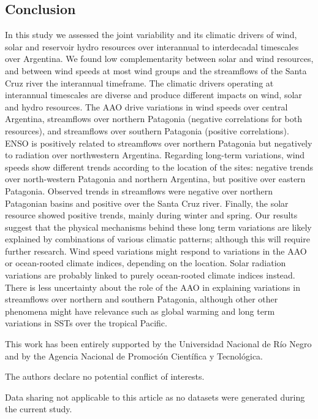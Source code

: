 \documentclass[AMA,Times1COL]{WileyNJDv5} %
\begin{document}
\begin{linenumbers}
\section{Conclusion}

In this study we assessed the joint variability and its climatic drivers of wind, solar and reservoir hydro resources over interannual to interdecadal timescales over Argentina. We found low complementarity between solar and wind resources, and between wind speeds at most wind groups and the streamflows of the Santa Cruz river the interannual timeframe. The climatic drivers operating at interannual timescales are diverse and produce different impacts on wind, solar and hydro resources. The AAO drive variations in wind speeds over central Argentina, streamflows over northern Patagonia (negative correlations for both resources), and streamflows over southern Patagonia (positive correlations). ENSO is positively related to streamflows over northern Patagonia but negatively to radiation over northwestern Argentina. Regarding long-term variations, wind speeds show different trends according to the location of the sites: negative trends over north-western Patagonia and northern Argentina, but positive over eastern Patagonia. Observed trends in streamflows were negative over northern Patagonian basins and positive over the Santa Cruz river. Finally, the solar resource showed positive trends, mainly during winter and spring. Our results suggest that the physical mechanisms behind these long term variations are likely explained by combinations of various climatic patterns; although this will require further research. Wind speed variations might respond to variations in the AAO or ocean-rooted climate indices, depending on the location. Solar radiation variations are probably linked to purely ocean-rooted climate indices instead. There is less uncertainty about the role of the AAO in explaining variations in streamflows over northern and southern Patagonia, although other other phenomena might have relevance such as global warming and long term variations in SSTs over the tropical Pacific. 



This work has been entirely supported by the Universidad Nacional de Río Negro and by the Agencia Nacional de Promoción Científica y Tecnológica. 



The authors declare no potential conflict of interests.


Data sharing not applicable to this article as no datasets were generated during the current study.



\end{linenumbers}
\end{document}
